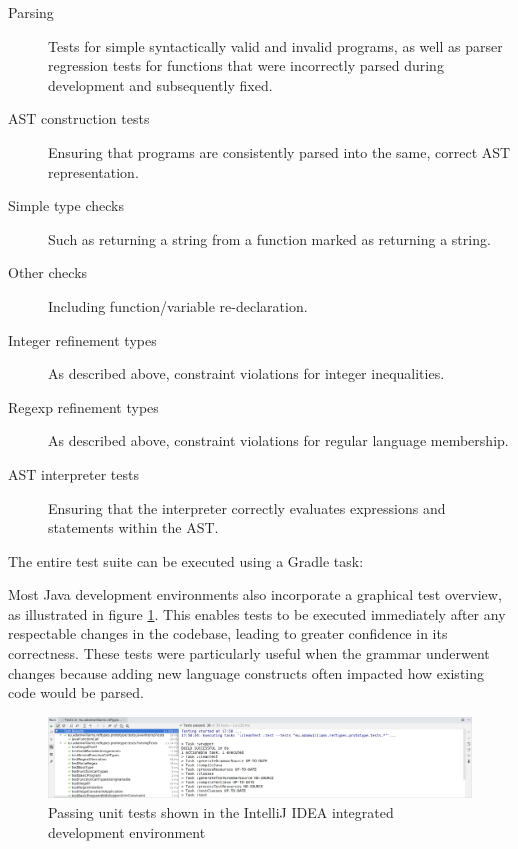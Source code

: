 \documentclass[a4paper,openany,12pt]{book}
\begin{document}
\begin{description}
    \item[Parsing] Tests for simple syntactically valid and invalid programs, as well as parser regression tests for functions that were incorrectly parsed during development and subsequently fixed.
    \item[AST construction tests] Ensuring that programs are consistently parsed into the same, correct AST representation.
    \item[Simple type checks] Such as returning a string from a function marked as returning a string.
    \item[Other checks] Including function/variable re-declaration.
    \item[Integer refinement types] As described above, constraint violations for integer inequalities.
    \item[Regexp refinement types] As described above, constraint violations for regular language membership.
    \item[AST interpreter tests] Ensuring that the interpreter correctly evaluates expressions and statements within the AST.
\end{description}

The entire test suite can be executed using a Gradle task:


Most Java development environments also incorporate a graphical test overview, as illustrated in figure \ref{fig:unittests}.
This enables tests to be executed immediately after any respectable changes in the codebase, leading to greater confidence in its correctness.
These tests were particularly useful when the grammar underwent changes because adding new language constructs often impacted how existing code would be parsed.


\begin{figure}
	\begin{MyMdframed}
		\vspace{0.5em}


		\caption{\label{fig:unittests} Passing unit tests shown in the IntelliJ IDEA integrated development environment}
		\vspace{0.5em}
		\captionsetup{style=default}
		\centering \includegraphics[width=\linewidth]{results.png}

	\end{MyMdframed}
\end{figure}
\end{document}
